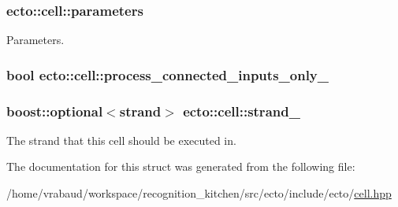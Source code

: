 \subsubsection[{\texorpdfstring{parameters}{parameters}}]{ ecto\+::cell\+::parameters}\hypertarget{structecto_1_1cell_ae00a91199c758cf7c24dcf0ecdf70a27}{}\label{structecto_1_1cell_ae00a91199c758cf7c24dcf0ecdf70a27}


Parameters. 

\subsubsection[{\texorpdfstring{process\+\_\+connected\+\_\+inputs\+\_\+only\+\_\+}{process_connected_inputs_only_}}]{\setlength{\rightskip}{0pt plus 5cm}bool ecto\+::cell\+::process\+\_\+connected\+\_\+inputs\+\_\+only\+\_\+\hspace{0.3cm}{\ttfamily [private]}}\hypertarget{structecto_1_1cell_a9a9d7fa3bb72fd74073a997bfb6cbad8}{}\label{structecto_1_1cell_a9a9d7fa3bb72fd74073a997bfb6cbad8}
\subsubsection[{\texorpdfstring{strand\+\_\+}{strand_}}]{\setlength{\rightskip}{0pt plus 5cm}boost\+::optional$<${\bf strand}$>$ ecto\+::cell\+::strand\+\_\+}\hypertarget{structecto_1_1cell_ada052f06257277c1b53c82226dff5821}{}\label{structecto_1_1cell_ada052f06257277c1b53c82226dff5821}


The strand that this cell should be executed in. 



The documentation for this struct was generated from the following file\+:\begin{DoxyCompactItemize}
\item 
/home/vrabaud/workspace/recognition\+\_\+kitchen/src/ecto/include/ecto/\hyperlink{cell_8hpp}{cell.\+hpp}\end{DoxyCompactItemize}
